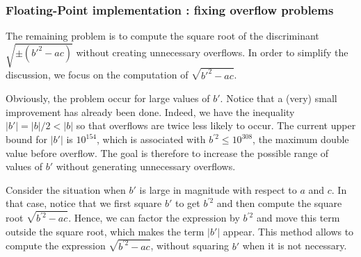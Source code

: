 \subsubsection{Floating-Point implementation : fixing overflow problems}
\label{section-quadratic-fixoverflow}

The remaining problem is to compute the square root of the 
discriminant $\sqrt{\pm(b'^2-ac)}$ without creating 
unnecessary overflows. In order to simplify the discussion, we 
focus on the computation of $\sqrt{b'^2-ac}$.

Obviously, the problem occur for large values of $b'$. 
Notice that a (very) small improvement has already been done. Indeed, we have the 
inequality $|b'|=|b|/2<|b|$
so that overflows are twice less likely to occur. The current upper bound 
for $|b'|$ is $10^{154}$, which is associated with 
$b^{'2}\leq 10^{308}$, the maximum double value before overflow.
The goal is therefore to increase the possible range of values of $b'$ without 
generating unnecessary overflows.

Consider the situation when $b'$ is large in magnitude with respect to $a$ and $c$. 
In that case, notice that we first square $b'$ to get $b^{'2}$
and then compute the square root $\sqrt{b^{'2} - ac}$.
Hence, we can factor the expression by $b^{'2}$ and move this 
term outside the square root, which makes the term $|b'|$ appear.
This method allows to compute the expression $\sqrt{b^{'2} - ac}$,
without squaring $b'$ when it is not necessary.

